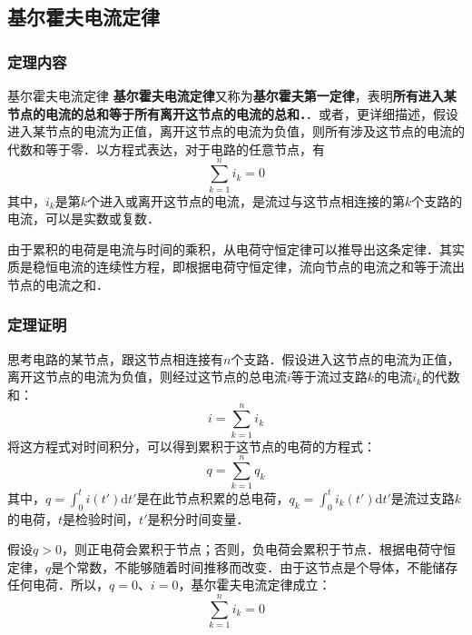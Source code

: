 
\subsection{基尔霍夫电流定律}

\subsubsection{定理内容}
\begin{theorem}{基尔霍夫电流定律}
\textbf{基尔霍夫电流定律}又称为\textbf{基尔霍夫第一定律}，表明\textbf{所有进入某节点的电流的总和等于所有离开这节点的电流的总和．}．或者，更详细描述，假设进入某节点的电流为正值，离开这节点的电流为负值，则所有涉及这节点的电流的代数和等于零．以方程式表达，对于电路的任意节点，有
\begin{equation}
\sum_{k=1}^n i_k =0
\end{equation}
其中，$i_k$是第$k$个进入或离开这节点的电流，是流过与这节点相连接的第$k$个支路的电流，可以是实数或复数．
\end{theorem}

由于累积的电荷是电流与时间的乘积，从电荷守恒定律可以推导出这条定律．其实质是稳恒电流的连续性方程，即根据电荷守恒定律，流向节点的电流之和等于流出节点的电流之和．

\subsubsection{定理证明}
思考电路的某节点，跟这节点相连接有$n$个支路．假设进入这节点的电流为正值，离开这节点的电流为负值，则经过这节点的总电流$i$等于流过支路$k$的电流$i_k$的代数和：
\begin{equation}
i=\sum_{k=1}^n i_k
\end{equation}
将这方程式对时间积分，可以得到累积于这节点的电荷的方程式：
\begin{equation}
q=\sum_{k=1}^n q_k
\end{equation}
其中，$\displaystyle q=\int_0^t i(t') \mathrm{d}t'$是在此节点积累的总电荷，$\displaystyle q_k=\int_0^t i_k(t') \mathrm{d}t'$是流过支路$k$的电荷，$t$是检验时间，$t'$是积分时间变量．

假设$q>0$，则正电荷会累积于节点；否则，负电荷会累积于节点．根据电荷守恒定律，$q$是个常数，不能够随着时间推移而改变．由于这节点是个导体，不能储存任何电荷．所以，$q=0$、$i=0$，基尔霍夫电流定律成立：
\begin{equation}
\sum_{k=1}^n i_k =0
\end{equation}

